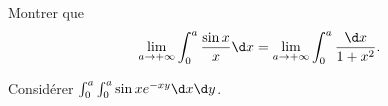 \begin{enonce}
\begin{exercise}[ID={RMS 122-2 E542 Mines-Ponts MP},subtitle={},tags={}]
Montrer que
\begin{equation*}
  \lim_{a\to+\infty} \int_0^a \frac{\sin x}{x}\d x
  =
  \lim_{a\to+\infty}\int_0^a\frac{\d x}{1+x^2}.
\end{equation*}
\begin{hint}
  Considérer $\int_0^a\int_0^a \sin xe^{-xy}\d x\d y$.
\end{hint}
\end{exercise}
\begin{solution}
\end{solution}
\end{enonce}
